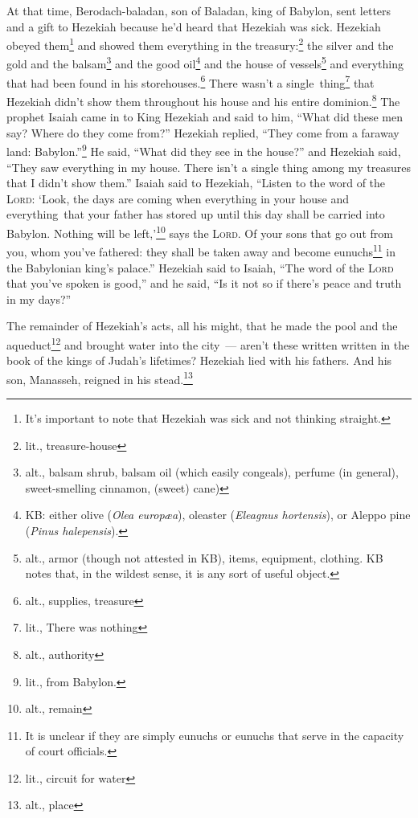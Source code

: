 \begin{inparaenum}
     At that time, Berodach-baladan, son of Baladan, king of Babylon, sent letters and a gift to Hezekiah because he'd heard that Hezekiah was sick.%
     Hezekiah obeyed them\footnote{It's important to note that Hezekiah was sick and not thinking straight.} and showed them everything in the treasury:\footnote{lit., treasure-house} the silver and the gold and the balsam\footnote{alt., balsam shrub, balsam oil (which easily congeals), perfume (in general), sweet-smelling cinnamon, (sweet) cane)} and the good oil\footnote{KB: either olive (\textit{Olea europ\ae a}), oleaster (\textit{Eleagnus hortensis}), or Aleppo pine (\textit{Pinus halepensis}).} and the house of vessels\footnote{alt., armor (though not attested in KB), items, equipment, clothing. KB notes that, in the wildest sense, it is any sort of useful object.} and everything that had been found in his storehouses.\footnote{alt., supplies, treasure} There wasn't a single\understood\ thing\footnote{lit., There was nothing} that Hezekiah didn't show them throughout his house and his entire dominion.\footnote{alt., authority}%
     The prophet Isaiah came in to King Hezekiah and said to him, ``What did these men say? Where do they come from?'' Hezekiah replied, ``They come from a faraway land: Babylon.''\footnote{lit., from Babylon.}%
     He said, ``What did they see in the house?'' and Hezekiah said, ``They saw everything in my house. There isn't a single thing among my treasures that I didn't show them.''%
     Isaiah said to Hezekiah, ``Listen to the word of the \textsc{Lord}:%
     `Look, the days are coming when everything in your house and everything\understood\ that your father has stored up until this day shall be carried into Babylon. Nothing will be left,'\footnote{alt., remain} says the \textsc{Lord}.%
     Of your sons that go out from you, whom you've fathered: they shall be taken away and become eunuchs\footnote{It is unclear if they are simply eunuchs or eunuchs that serve in the capacity of court officials.} in the Babylonian king's palace.''%
     Hezekiah said to Isaiah, ``The word of the \textsc{Lord} that you've spoken is good,'' and he said, ``Is it not so if there's peace and truth in my days?''%
    
     The remainder of Hezekiah's acts, all his might, that he made the pool and the aqueduct\footnote{lit., circuit for water} and brought water into the city~--- aren't these written written in the book of the kings of Judah's lifetimes?%
     Hezekiah lied with his fathers. And his son, Manasseh, reigned in his stead.\footnote{alt., place}%
\end{inparaenum}
